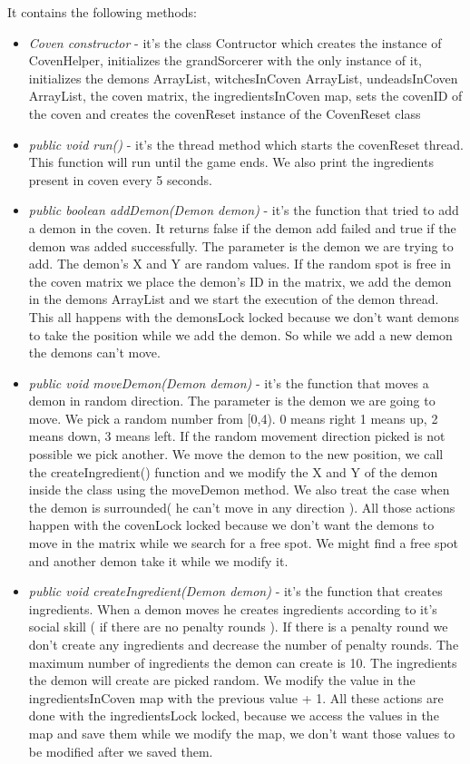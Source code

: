 \documentclass[14pt]{article}
\begin{document}
It contains the following methods:\\
\begin{itemize}
            \item \textit{Coven constructor} - it's the class Contructor which creates the instance of CovenHelper, initializes the grandSorcerer with the only instance of it, initializes the demons ArrayList, witchesInCoven ArrayList, undeadsInCoven ArrayList, the coven matrix, the ingredientsInCoven map, sets the covenID of the coven and creates the covenReset instance of the CovenReset class
            \item \textit{public void run()} - it's the thread method which starts the covenReset thread. This function will run until the game ends. We also print the ingredients present in coven every 5 seconds.
            \item \textit{public boolean addDemon(Demon demon)} - it's the function that tried to add a demon in the coven. It returns false if the demon add failed and true if the demon was added successfully. The parameter is the demon we are trying to add. The demon's X and Y are random values. If the random spot is free in the coven matrix we place the demon's ID in the matrix, we add the demon in the demons ArrayList and we start the execution of the demon thread. This all happens with the demonsLock locked because we don't want demons to take the position while we add the demon. So while we add a new demon the demons can't move.
            \item \textit{public void moveDemon(Demon demon)} - it's the function that moves a demon in random direction. The parameter is the demon we are going to move. We pick a random number from [0,4). 0 means right 1 means up, 2 means down, 3 means left. If the random movement direction picked is not possible we pick another. We move the demon to the new position, we call the createIngredient() function and we modify the X and Y of the demon inside the class using the moveDemon method. We also treat the case when the demon is surrounded( he can't move in any direction ). All those actions happen with the covenLock locked because we don't want the demons to move in the matrix while we search for a free spot. We might find a free spot and another demon take it while we modify it.
            \item \textit{public void createIngredient(Demon demon)} - it's the function that creates ingredients. When a demon moves he creates ingredients according to it's social skill ( if there are no penalty rounds ). If there is a penalty round we don't create any ingredients and decrease the number of penalty rounds. The maximum number of ingredients the demon can create is 10. The ingredients the demon will create are picked random. We modify the value in the ingredientsInCoven map with the previous value + 1. All these actions are done with the ingredientsLock locked, because we access the values in the map and save them while we modify the map, we don't want those values to be modified after we saved them.

\end{itemize}
\end{document}
